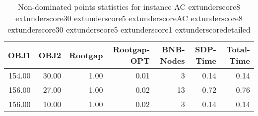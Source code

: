 \begin{table}
\caption{Non-dominated points statistics for instance AC	extunderscore8	extunderscore30	extunderscore5	extunderscoreAC	extunderscore8	extunderscore30	extunderscore5	extunderscore1	extunderscoredetailed}
\label{tab:stats/AC_8_30_5_AC_8_30_5_1_detailed}
\begin{tabular}{rrrrrrr}
\toprule
OBJ1 & OBJ2 & Rootgap & Rootgap-OPT & BNB-Nodes & SDP-Time & Total-Time \\
\midrule
154.00 & 30.00 & 1.00 & 0.01 & 3 & 0.14 & 0.14 \\
156.00 & 27.00 & 1.00 & 0.02 & 13 & 0.72 & 0.76 \\
156.00 & 10.00 & 1.00 & 0.02 & 3 & 0.14 & 0.14 \\
\bottomrule
\end{tabular}
\end{table}
